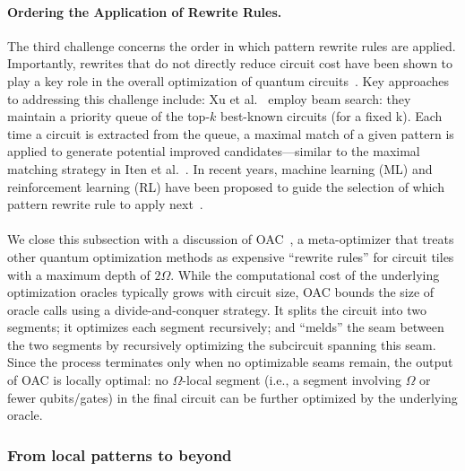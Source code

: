 \documentclass[a4paper,onecolumn,11pt,unpublished]{quantumarticle}
\begin{document}
\paragraph{Ordering the Application of Rewrite Rules.} The third challenge concerns the order in which pattern rewrite rules are applied. Importantly, rewrites that do not directly reduce circuit cost have been shown to play a key role in the overall optimization of quantum circuits~\cite{liQuarlLearningBasedQuantum2023, xuSynthesizingQuantumCircuitOptimizers2023}. Key approaches to addressing this challenge include: Xu et al.~\cite{xuSynthesizingQuantumCircuitOptimizers2023} employ beam search: they maintain a priority queue of the top-$k$ best-known circuits (for a fixed k). Each time a circuit is extracted from the queue, a maximal match of a given pattern is applied to generate potential improved candidates---similar to the maximal matching strategy in Iten et al.~\cite{itenExactPracticalPattern2022}. In recent years, machine learning (ML) and reinforcement learning (RL) have been proposed to guide the selection of which pattern rewrite rule to apply next~\cite{Fosel2021Quantum, liQuarlLearningBasedQuantum2023}.

\paragraph*{}We close this subsection with a discussion of OAC~\cite{aroraLocalOptimizationQuantum2025}, a meta-optimizer that treats other quantum optimization methods as expensive ``rewrite rules'' for circuit tiles with a maximum depth of $2\Omega$. While the computational cost of the underlying optimization oracles typically grows with circuit size, OAC bounds the size of oracle calls using a divide-and-conquer strategy. It splits the circuit into two segments; it optimizes each segment recursively; and ``melds'' the seam between the two segments by recursively optimizing the subcircuit spanning this seam. Since the process terminates only when no optimizable seams remain, the output of OAC is locally optimal: no $\Omega$-local segment (i.e., a segment involving $\Omega$ or fewer qubits/gates) in the final circuit can be further optimized by the underlying oracle.

\subsubsection{From local patterns to beyond}
\label{subsubsec:beyond}

\end{document}
